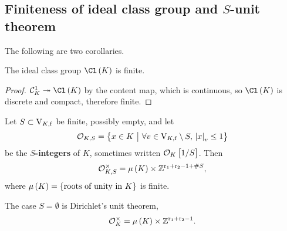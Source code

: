 \pagebreak

\subsection{Finiteness of ideal class group and \texorpdfstring{$ S $}{S}-unit theorem}

The following are two corollaries.

\begin{corollary}
The ideal class group $ \Cl\br{K} $ is finite.
\end{corollary}

\begin{proof}
$ \CCC_K^1 \twoheadrightarrow \Cl\br{K} $ by the content map, which is continuous, so $ \Cl\br{K} $ is discrete and compact, therefore finite.
\end{proof}

\begin{corollary}
\label{cor:7.7}
Let $ S \subset \mathrm{V}_{K, \mathrm{f}} $ be finite, possibly empty, and let
$$ \OOO_{K, S} = \cbr{x \in K \st \forall v \in \V_{K, \f} \setminus S, \ \abs{x}_v \le 1} $$
be the \textbf{$ S $-integers} of $ K $, sometimes written $ \OOO_K\sbr{1 / S} $. Then
$$ \OOO_{K, S}^\times = \mu\br{K} \times \ZZ^{\r_1 + \r_2 - 1 + \#S}, $$
where $ \mu\br{K} = \cbr{\text{roots of unity in} \ K} $ is finite.
\end{corollary}

The case $ S = \emptyset $ is Dirichlet's unit theorem,
$$ \OOO_K^\times = \mu\br{K} \times \ZZ^{\r_1 + \r_2 - 1}. $$

